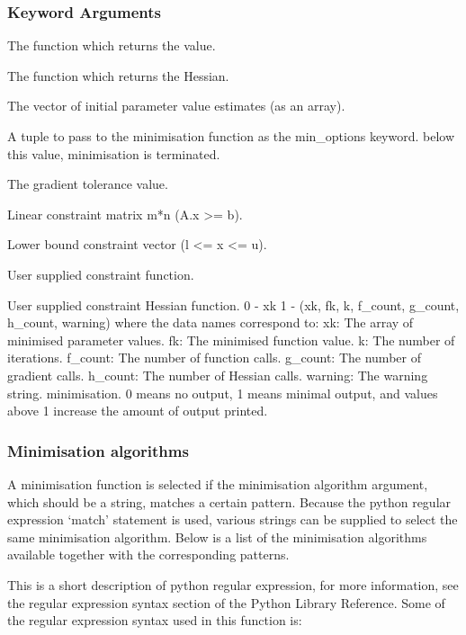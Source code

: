 \subsubsection{Keyword Arguments}

  The function which returns the value.

  The function which returns the Hessian.

  The vector of initial parameter value estimates (as an array).

  A tuple to pass to the minimisation function as the min\_options keyword.
below this value, minimisation is terminated.

  The gradient tolerance value.

  Linear constraint matrix m*n (A.x >= b).

  Lower bound constraint vector (l <= x <= u).

  User supplied constraint function.

  User supplied constraint Hessian function.
 0 - xk 1 - (xk, fk, k, f\_count, g\_count, h\_count, warning) where the data names correspond to: xk:      The array of minimised parameter values. fk:      The minimised function value. k:       The number of iterations. f\_count: The number of function calls. g\_count: The number of gradient calls. h\_count: The number of Hessian calls. warning: The warning string.
minimisation.  0 means no output, 1 means minimal output, and values above 1 increase the amount
of output printed.


\subsubsection{Minimisation algorithms}

A minimisation function is selected if the minimisation algorithm argument, which should be a
string, matches a certain pattern.  Because the python regular expression `match' statement is
used, various strings can be supplied to select the same minimisation algorithm.  Below is a
list of the minimisation algorithms available together with the corresponding patterns.

This is a short description of python regular expression, for more information, see the
regular expression syntax section of the Python Library Reference.  Some of the regular
expression syntax used in this function is:

